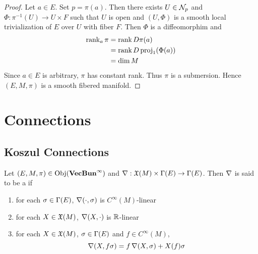 \documentclass{book}
\begin{document}
\begin{proof}
	Let $a \in E$. Set $p = \pi(a)$. Then there exists $U \in \mathcal{N}_p$ and $\Phi:\pi^{-1}(U) \rightarrow U \times F$ such that $U$ is open and $(U, \Phi)$ is a smooth local trivialization of $E$ over $U$ with fiber $F$. Then $\Phi$ is a diffeomorphim and 
	\begin{align*}
		\operatorname{\text{rank}}_a \pi
		& = \operatorname{\text{rank}} D\pi(a) \\
		& = \operatorname{\text{rank}} D \operatorname{\text{proj}}_1(\Phi(a)) \\
		& = \dim M 
	\end{align*} 
	Since $a \in E$ is arbitrary, $\pi$ has constant rank. Thus $\pi$ is a submersion. Hence $(E, M, \pi)$ is a smooth fibered manifold.
\end{proof}



































	
	\newpage
	\chapter{Connections}
	
	\section{Koszul Connections}
	
	\begin{defn}
		Let $(E, M, \pi) \in \operatorname{Obj}(\operatorname*{\text{\textbf{VecBun}}^{\infty}})$ and $\operatorname{\nabla} : \mathfrak{X}(M) \times \Gamma(E) \rightarrow \Gamma(E)$. Then $\operatorname{\nabla}$ is said to be a  if 
		\begin{enumerate}
			\item for each $\sigma \in \Gamma(E)$, $\operatorname{\nabla}(\cdot, \sigma)$ is $C^{\infty}(M)$-linear
			\item for each $X \in \mathfrak{X}(M)$, $\operatorname{\nabla}(X, \cdot)$ is $\mathbb{R}$-linear
			\item for each $X \in \mathfrak{X}(M)$, $\sigma \in \Gamma(E)$ and $f \in C^{\infty}(M)$, 
			$$\operatorname{\nabla}(X, f\sigma) = f \operatorname{\nabla}(X, \sigma) + X(f) \sigma$$ 
		\end{enumerate}
	\end{defn}
\end{document}
